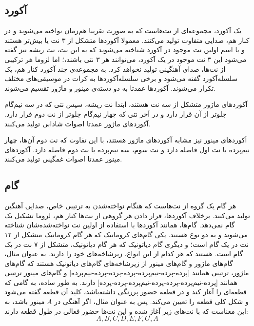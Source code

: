 \subsection{
آکورد
}

یک آکورد، مجموعه‌ای از نت‌هاست که به صورت تقریبا هم‌زمان نواخته می‌شوند و در کنار هم، صدایی متفاوت تولید می‌کنند.
معمولا آکوردها متشکل از ۳ نت یا بیش‌تر هستند و با اسم اولین نت موجود در آکورد شناخته می‌شوند که به این نت، نت ریشه نیز گفته می‌شود این ۳ نت موجود در یک آکورد، می‌توانند هر ۳ نتی باشند،؛ اما لزوما هر ترکیبی از نت‌ها، صدای آهنگینی تولید نخواهد کرد.
به مجموعه‌ی چند آکورد کنار هم، یک سلسله‌آکورد گفته می‌شود و برخی سلسله‌آکوردها به کرات در موسیقی‌های مختلف تکرار می‌شوند.
آکوردها عمدتا به دو دسته‌ی مینور و ماژور تقسیم می‌شوند.

آکوردهای ماژور متشکل از سه نت هستند، ابتدا نت ریشه، سپس نتی که در سه نیم‌گام جلوتر از آن قرار دارد و در آخر نتی که چهار نیم‌گام جلوتر از نت دوم قرار دارد. آکوردهای ماژور عمدتا اصوات شادابی تولید می‌کنند.

آکوردهای مینور نیز مشابه آکوردهای ماژور هستند، با این تفاوت که نت دوم آن‌ها، چهار نیم‌پرده با نت اول فاصله دارد و نت سوم، سه نیم‌پرده با نت دوم فاصله دارد.
آکوردهای مینور عمدتا اصوات غمگینی تولید می‌کنند.

\subsection{
گام
}
هر گام یک گروه از نت‌هاست که هنگام نواخته‌شدن به ترتیبی خاص، صدایی آهنگین تولید می‌کنند. برخلاف آکوردها، قرار دادن هر گروهی از نت‌ها کنار هم، لزوما تشکیل یک گام نمی‌دهد.
گام‌ها، همانند آکوردها با استفاده از اولین نت نواخته‌شده‌شان شناخته می‌شوند و به دو نوع هستند. یکی
گام‌های کروماتیک  که هر گام کروماتیک متشکل از ۱۲ نت در یک گام است؛
و دیگری گام دیاتونیک که هر گام دیاتونیک، متشکل از ۷ نت در یک گام است.
هستند که هر کدام از این انواع، زیرشاخه‌های خود را دارند. به عنوان مثال، گام‌های ماژور و گام‌های مینور از زیرشاخه‌های گام‌های دیاتونیک هستند که گام‌های ماژور، ترتیبی همانند
[پرده-پرده-نیم‌پرده-پرده-پرده-پرده-نیم‌پرده]
و گام‌های مینور ترتیبی همانند
[پرده-نیم‌پرده-پرده-پرده-نیم‌پرده-پرده-پرده] دارند.
به طور ساده، به گامی که قطعه‌ای را آغاز کند و در قطعه حضور پررنگی داشته‌باشد، کلید آن قطعه گفته می‌شود و شکل کلی قطعه را تعیین می‌کند.
پس به عنوان مثال، اگر آهنگی در
$A$
مینور باشد، به این معناست که با نت‌های زیر آغاز شده و این نت‌ها حضور فعالی در طول قطعه دارند:
\begin{equation}
    A, B, C, D, E, F, G, A
\end{equation}

